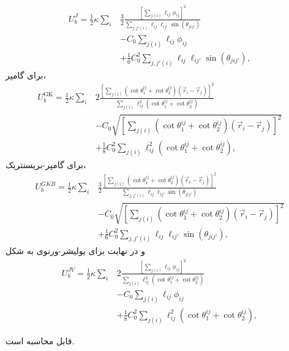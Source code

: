\begin{equation}
\begin{aligned}
U_b^J=\frac{1}{2}\kappa\sum_i&\frac{3}{2}\frac{\left[\sum_{j(i)}\ell_{ij}\phi_{ij}\right]^2}{\sum_{j,j'(i)}\ell_{ij}\ell_{ij'}\sin(\theta_{jij'})}\\
&-C_0\sum_{j(i)}\ell_{ij}\phi_{ij}\\
&+\frac{1}{6}C_0^2\sum_{j,j'(i)}\ell_{ij}\ell_{ij'}\sin(\theta_{jij'}),
\end{aligned}
\end{equation}
برای گامپر،
\begin{equation}
\begin{aligned}
U_b^\text{GK}=\frac{1}{2}\kappa\sum_i&2\frac{\left[\sum_{j(i)}(\cot\theta_1^{ij}+\cot\theta_2^{ij})(\vec r_i-\vec r_j)\right]^2}{\sum_{j(i)}\ell_{ij}^2(\cot\theta_1^{ij}+\cot\theta_2^{ij})}\\
&-C_0\sqrt{\left[\sum_{j(i)}(\cot\theta_1^{ij}+\cot\theta_2^{ij})(\vec r_i-\vec r_j)\right]^2}\\
&+\frac{1}{8}C_0^2\sum_{j(i)}\ell_{ij}^2(\cot\theta_1^{ij}+\cot\theta_2^{ij}),
\end{aligned}
\end{equation}
برای گامپر-بریسنتریک،
\begin{equation}
\begin{aligned}
U_b^{GKB}=\frac{1}{2}\kappa\sum_i&\frac{3}{2}\frac{\left[\sum_{j(i)}(\cot\theta_1^{ij}+\cot\theta_2^{ij})(\vec r_i-\vec r_j)\right]^2}{\sum_{j,j'(i)}\ell_{ij}\ell_{ij'}\sin(\theta_{jij'})}\\
&-C_0\sqrt{\left[\sum_{j(i)}(\cot\theta_1^{ij}+\cot\theta_2^{ij})(\vec r_i-\vec r_j)\right]^2}\\
&+\frac{1}{6}C_0^2\sum_{j,j'(i)}\ell_{ij}\ell_{ij'}\sin(\theta_{jij'}),
\end{aligned}
\end{equation}
و در نهایت برای یولیشر-ورنوی به شکل
\begin{equation}
\begin{aligned}
U_b^{JV}=\frac{1}{2}\kappa\sum_i&2\frac{\left[\sum_{j(i)}\ell_{ij}\phi_{ij}\right]^2}{\sum_{j(i)}\ell_{ij}^2(\cot\theta_1^{ij}+\cot\theta_2^{ij})}\\
&-C_0\sum_{j(i)}\ell_{ij}\phi_{ij}\\
&+\frac{1}{8}C_0^2\sum_{j(i)}\ell_{ij}^2(\cot\theta_1^{ij}+\cot\theta_2^{ij}),
\end{aligned}
\end{equation}

قابل محاسبه‌ است.


